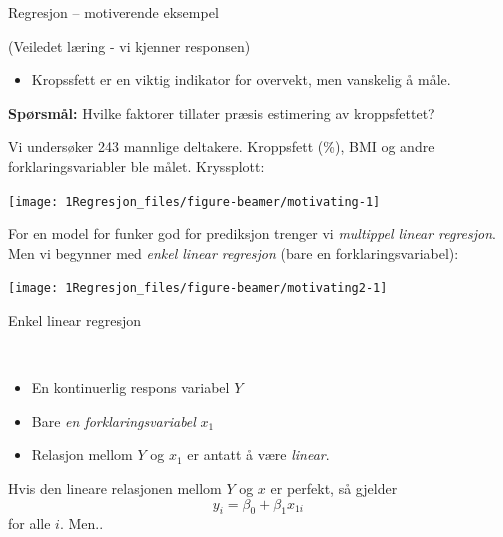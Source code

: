\documentclass[10pt,ignorenonframetext,]{beamer}
\providecommand{\tightlist}{%
  \setlength{\itemsep}{0pt}\setlength{\parskip}{0pt}}
\begin{document}
\begin{frame}{Regresjon -- motiverende eksempel}
\protect\hypertarget{regresjon-motiverende-eksempel}{}

\centering\tiny(Veiledet læring - vi kjenner responsen)

\vspace{2mm}

\flushleft
\normalsize

\begin{itemize}
\tightlist
\item
  Kropssfett er en viktig indikator for overvekt, men vanskelig å måle.
\end{itemize}

\vspace{2mm}

\textbf{Spørsmål:} Hvilke faktorer tillater præsis estimering av
kroppsfettet?

\vspace{2mm}

Vi undersøker 243 mannlige deltakere. Kroppsfett (\%), BMI og andre
forklaringsvariabler ble målet. Kryssplott:

\begin{center}\texttt{[image: 1Regresjon\_files/figure-beamer/motivating-1]} \end{center}

\end{frame}

\begin{frame}

For en model for funker god for prediksjon trenger vi \emph{multippel
linear regresjon}. Men vi begynner med \emph{enkel linear regresjon}
(bare en forklaringsvariabel):

\begin{center}\texttt{[image: 1Regresjon\_files/figure-beamer/motivating2-1]} \end{center}

\end{frame}

\begin{frame}{Enkel linear regresjon}
\protect\hypertarget{enkel-linear-regresjon}{}

\(~\)

\begin{itemize}
\item
  En kontinuerlig respons variabel \(Y\)
\item
  Bare \emph{en forklaringsvariabel} \(x_1\)
\item
  Relasjon mellom \(Y\) og \(x_1\) er antatt å være \emph{linear}.
\end{itemize}

\vspace{6mm}

Hvis den lineare relasjonen mellom \(Y\) og \(x\) er perfekt, så gjelder
\[y_i = \beta_0 + \beta_1 x_{1i}\ \] for alle \(i\). Men..

\end{frame}
\end{document}
